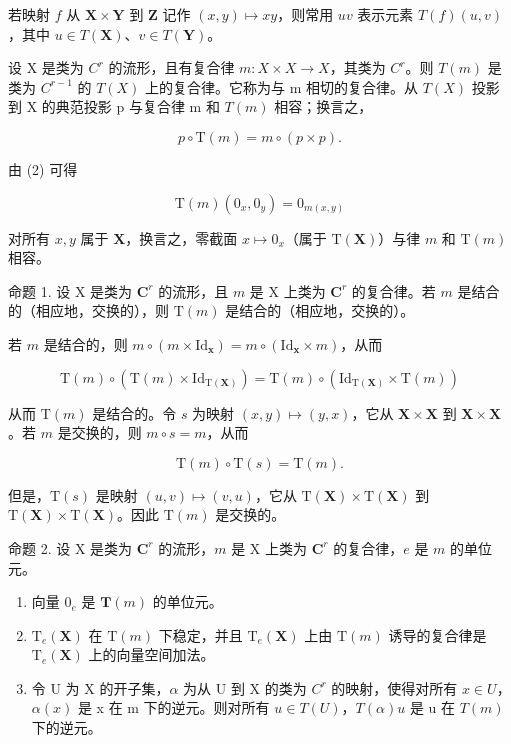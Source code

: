若映射 \(f\) 从 \(\mathbf{X} \times \mathbf{Y}\) 到 \(\mathbf{Z}\) 记作 \((x, y) \mapsto xy\)，则常用 \(uv\) 表示元素 \(T(f)(u, v)\)，其中 \(u \in T(\mathbf{X})\)、\(v \in T(\mathbf{Y})\)。

设 X 是类为 \(C^{r}\) 的流形，且有复合律 \(m: X \times X \to X\)，其类为 \(C^{r}\)。则 \(T(m)\) 是类为 \(C^{r-1}\) 的 \(T(X)\) 上的复合律。它称为与 m 相切的复合律。从 \(T(X)\) 投影到 X 的典范投影 p 与复合律 m 和 \(T(m)\) 相容；换言之，

\[
p \circ \mathrm{T} (m) = m \circ (p \times p).\tag{5}
\]

由 (2) 可得

\[
\mathrm{T} (m) \left(0 _ {x}, 0 _ {y}\right) = 0 _ {m (x, y)}\tag{6}
\]

对所有 \(x, y\) 属于 \(\mathbf{X}\)，换言之，零截面 \(x \mapsto 0_x\)（属于 \(\mathrm{T}(\mathbf{X})\)）与律 \(m\) 和 \(\mathrm{T}(m)\) 相容。

命题 1. 设 X 是类为 \(\mathbf{C}^r\) 的流形，且 \(m\) 是 X 上类为 \(\mathbf{C}^r\) 的复合律。若 \(m\) 是结合的（相应地，交换的），则 \(\mathrm{T}(m)\) 是结合的（相应地，交换的）。

若 \(m\) 是结合的，则 \(m \circ (m \times \mathrm{Id}_{\mathbf{x}}) = m \circ (\mathrm{Id}_{\mathbf{x}} \times m)\)，从而

\[
\mathrm{T} (m) \circ (\mathrm{T} (m) \times \mathrm{Id} _ {\mathrm{T} (\mathbf {X})}) = \mathrm{T} (m) \circ (\mathrm{Id} _ {\mathrm{T} (\mathbf {X})} \times \mathrm{T} (m))
\]

从而 \(\mathrm{T}(m)\) 是结合的。令 \(s\) 为映射 \((x,y)\mapsto (y,x)\)，它从 \(\mathbf{X}\times \mathbf{X}\) 到 \(\mathbf{X}\times \mathbf{X}\)。若 \(m\) 是交换的，则 \(m\circ s = m\)，从而

\[
\mathrm{T} (m) \circ \mathrm{T} (s) = \mathrm{T} (m).
\]

但是，\(\mathrm{T}(s)\) 是映射 \((u,v)\mapsto (v,u)\)，它从 \(\mathrm{T}(\mathbf{X})\times \mathrm{T}(\mathbf{X})\) 到 \(\mathrm{T}(\mathbf{X})\times \mathrm{T}(\mathbf{X})\)。因此 \(\mathrm{T}(m)\) 是交换的。

命题 2. 设 X 是类为 \(\mathbf{C}^r\) 的流形，\(m\) 是 X 上类为 \(\mathbf{C}^r\) 的复合律，\(e\) 是 \(m\) 的单位元。

\begin{enumerate}
\def\labelenumi{(\roman{enumi})}
\item
  向量 \(0_{e}\) 是 \(\mathbf{T}(m)\) 的单位元。
\item
  \(\mathrm{T}_{e}(\mathbf{X})\) 在 \(\mathrm{T}(m)\) 下稳定，并且 \(\mathrm{T}_{e}(\mathbf{X})\) 上由 \(\mathrm{T}(m)\) 诱导的复合律是 \(\mathrm{T}_{e}(\mathbf{X})\) 上的向量空间加法。
\item
  令 U 为 X 的开子集，\(\alpha\) 为从 U 到 X 的类为 \(C^{r}\) 的映射，使得对所有 \(x \in U\)，\(\alpha(x)\) 是 x 在 m 下的逆元。则对所有 \(u \in T(U)\)，\(T(\alpha)u\) 是 u 在 \(T(m)\) 下的逆元。
\end{enumerate}


